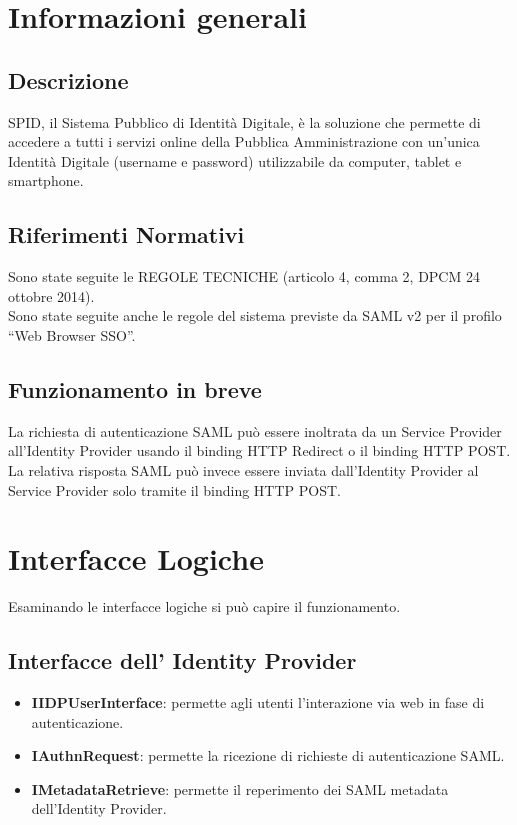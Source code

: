 \section{Informazioni generali}
\subsection{Descrizione}
SPID, il Sistema Pubblico di Identità Digitale, è la soluzione che permette di accedere a tutti i servizi online della Pubblica Amministrazione con un'unica Identità Digitale (username e password) utilizzabile da computer, tablet e smartphone.
\subsection{Riferimenti Normativi}
Sono state seguite le REGOLE TECNICHE (articolo 4, comma 2, DPCM 24 ottobre 2014).
\\ Sono state seguite anche le regole del sistema previste da SAML v2 per il profilo “Web
Browser SSO”.
\subsection{Funzionamento in breve}
La richiesta di autenticazione SAML può essere inoltrata 
da un Service Provider all’Identity Provider
usando il binding HTTP Redirect o il binding HTTP POST.
\\ La relativa risposta SAML può invece essere inviata
dall’Identity Provider al Service Provider 
solo tramite il binding HTTP POST.

\section{Interfacce Logiche}
Esaminando le interfacce logiche si può capire il funzionamento.
\subsection{Interfacce dell' Identity Provider}
\begin{itemize}
    \item \textbf{IIDPUserInterface}: permette agli utenti l’interazione via web in fase di autenticazione.
    \item \textbf{IAuthnRequest}: permette la ricezione di richieste di autenticazione SAML.
    \item \textbf{IMetadataRetrieve}: permette il reperimento dei SAML metadata dell’Identity Provider.
\end{itemize}
